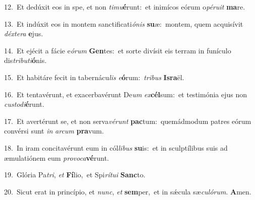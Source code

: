 {\numbfont\textcolor{\numbcolor}{12.}}~Et dedúxit eos in spe, et non \textit{ti}\-\textit{mu}\textbf{é}runt:~\star et inimícos eórum o\-\textit{pé}\-\textit{ru}\textit{it} \textbf{ma}\-re.\par
{\numbfont\textcolor{\numbcolor}{13.}}~Et indúxit eos in montem sanctificati\-\textit{ó}\-\textit{nis} \textbf{su}\-æ:~\star montem, quem acquisívit \textit{déx}\-\textit{te}\textit{ra} \textbf{e}\-jus.\par
{\numbfont\textcolor{\numbcolor}{14.}}~Et ejécit a fácie e\-\textit{ó}\-\textit{rum} \textbf{Gen}\-tes:~\star et sorte divísit eis terram in funículo dis\-\textit{tri}\-\textit{bu}\textit{ti}\textbf{ó}nis.\par
{\numbfont\textcolor{\numbcolor}{15.}}~Et habitáre fecit in tabernácu\textit{lis} \textit{e}\-\textbf{ó}rum:~\star \textit{tri}\-\textit{bus} \textbf{Is}\-\textbf{ra}ël.\par
{\numbfont\textcolor{\numbcolor}{16.}}~Et tentavérunt, et exacerbavérunt De\textit{um} \textit{ex}\-\textbf{cél}sum:~\star et testimónia ejus non \textit{cus}\-\textit{to}\textit{di}\textbf{é}runt.\par
{\numbfont\textcolor{\numbcolor}{17.}}~Et avertérunt se, et non serva\-\textit{vé}\-\textit{runt} \textbf{pac}\-tum:~\star quemádmodum patres eórum convérsi sunt \textit{in} \textit{ar}\-\textit{cum} \textbf{pra}\-vum.\par
{\numbfont\textcolor{\numbcolor}{18.}}~In iram concitavérunt eum in cól\-\textit{li}\-\textit{bus} \textbf{su}\-is:~\star et in sculptílibus suis ad æmulatiónem eum \textit{pro}\-\textit{vo}\textit{ca}\textbf{vé}runt.\par
{\numbfont\textcolor{\numbcolor}{19.}}~Glória Pa\-\textit{tri}\-, \textit{et} \textbf{Fí}\-lio,~\star et Spi\-\textit{rí}\-\textit{tu}\textit{i} \textbf{Sanc}\-to.\par
{\numbfont\textcolor{\numbcolor}{20.}}~Sicut erat in princípio, et \textit{nunc}\-, \textit{et} \textbf{sem}\-per,~\star et in sǽcula sæ\-\textit{cu}\-\textit{ló}\textit{rum}. \textbf{A}\-men.\par
